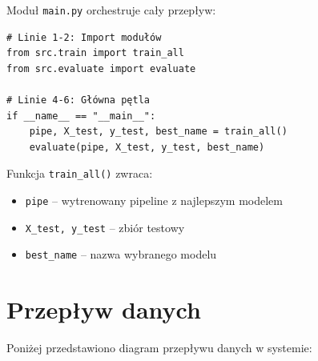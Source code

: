 \documentclass[12pt]{article}
\begin{document}
Moduł \texttt{main.py} orchestruje cały przepływ:

\begin{lstlisting}[caption={\texttt{src/main.py} (linie 1--6): Punkt wejścia aplikacji}]
# Linie 1-2: Import modułów
from src.train import train_all
from src.evaluate import evaluate

# Linie 4-6: Główna pętla
if __name__ == "__main__":
    pipe, X_test, y_test, best_name = train_all()
    evaluate(pipe, X_test, y_test, best_name)
\end{lstlisting}

\noindent
Funkcja \texttt{train\_all()} zwraca:
\begin{itemize}
    \item \texttt{pipe} – wytrenowany pipeline z najlepszym modelem
    \item \texttt{X\_test, y\_test} – zbiór testowy
    \item \texttt{best\_name} – nazwa wybranego modelu
\end{itemize}

\section{Przepływ danych}

Poniżej przedstawiono diagram przepływu danych w systemie:
\end{document}
